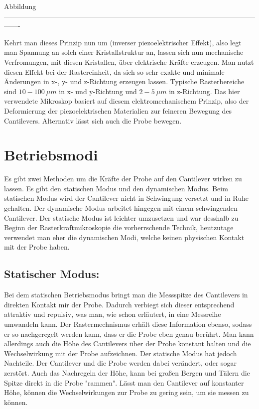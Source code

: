 Abbildung
-------------------------------------------------------------------------------------------------------------------

Kehrt man dieses Prinzip nun um (inverser piezoelektrischer Effekt), also legt man Spannung an solch einer Kristallstruktur an, lassen sich nun mechanische Verfromungen, mit diesen Kristallen, über elektrische Kräfte erzeugen.
Man nutzt diesen Effekt bei der Rastereinheit, da sich so sehr exakte und minimale Änderungen in x-, y- und z-Richtung erzeugen lassen.
Typische Rasterbereiche sind $10-\SI{100}{\mu m}$ in x- und y-Richtung und $2-\SI{5}{\mu m}$ in z-Richtung.
Das hier verwendete Mikroskop basiert auf diesem elektromechanischem Prinzip, also der Deformierung der piezoelektrischen Materialien zur feineren Bewegung des Cantilevers.
Alternativ lässt sich auch die Probe bewegen.


\section{Betriebsmodi}


Es gibt zwei Methoden um die Kräfte der Probe auf den Cantilever wirken zu lassen.
Es gibt den statischen Modus und den dynamischen Modus. 
Beim statischen Modus wird der Cantilever nicht in Schwingung versetzt und in Ruhe gehalten.
Der dynamische Modus arbeitet hingegen mit einem schwingenden Cantilever.
Der statische Modus ist leichter umzusetzen und war desshalb zu Beginn der Rasterkraftmikroskopie die vorherrschende Technik, heutzutage verwendet man eher die dynamischen Modi, welche keinen physischen Kontakt mit der Probe haben.


\subsection{Statischer Modus:}

Bei dem statischen Betriebsmodus bringt man die Messspitze des Cantilevers in direkten Kontakt mir der Probe.
Dadurch verbiegt sich dieser entsprechend attraktiv und repulsiv, was man, wie schon erläutert, in eine Messreihe umwandeln kann.
Der Rastermechnismus erhält diese Information ebenso, sodass er so nachgeregelt werden kann, dass er die Probe eben genau berührt.
Man kann allerdings auch die Höhe des Cantilevers über der Probe konstant halten und die Wechselwirkung mit der Probe aufzeichnen.
Der statische Modus hat jedoch Nachteile.
Der Cantilever und die Probe werden dabei verändert, oder sogar zerstört.
Auch das Nachregeln der Höhe, kann bei großen Bergen und Tälern die Spitze direkt in die Probe "rammen".
Lässt man den Cantilever auf konstanter Höhe, können die Wechselwirkungen zur Probe zu gering sein, um sie messen zu können.


